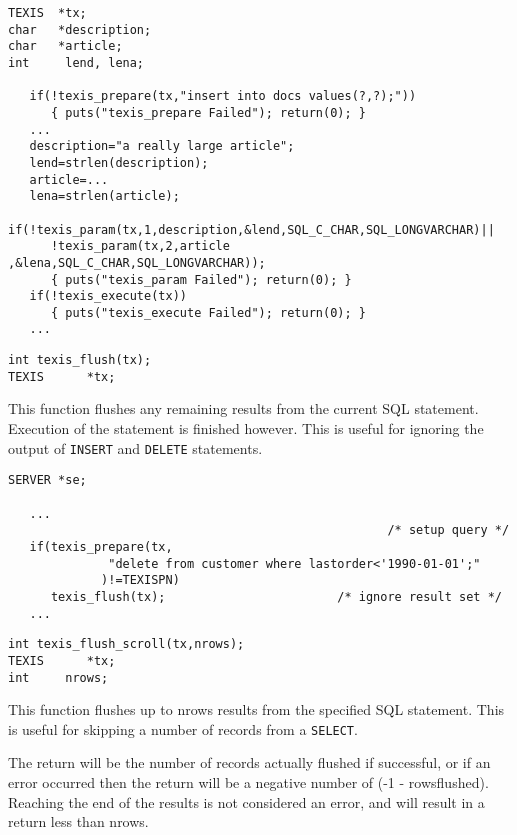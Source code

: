\EXAMPLE
\begin{verbatim}
TEXIS  *tx;
char   *description;
char   *article;
int     lend, lena;

   if(!texis_prepare(tx,"insert into docs values(?,?);"))
      { puts("texis_prepare Failed"); return(0); }
   ...
   description="a really large article";
   lend=strlen(description);
   article=...
   lena=strlen(article);
   if(!texis_param(tx,1,description,&lend,SQL_C_CHAR,SQL_LONGVARCHAR)||
      !texis_param(tx,2,article    ,&lena,SQL_C_CHAR,SQL_LONGVARCHAR));
      { puts("texis_param Failed"); return(0); }
   if(!texis_execute(tx))
      { puts("texis_execute Failed"); return(0); }
   ...
\end{verbatim}


\SYNOPSIS
\begin{verbatim}
int texis_flush(tx);
TEXIS      *tx;
\end{verbatim}

\DESCRIPTION

This function flushes any remaining results from the current SQL
statement. Execution of the statement is finished however. This
is useful for ignoring the output of \verb`INSERT` and \verb`DELETE` statements.

\EXAMPLE
\begin{verbatim}
SERVER *se;

   ...
                                                     /* setup query */
   if(texis_prepare(tx,
              "delete from customer where lastorder<'1990-01-01';"
             )!=TEXISPN)
      texis_flush(tx);                        /* ignore result set */
   ...
\end{verbatim}



\SYNOPSIS
\begin{verbatim}
int texis_flush_scroll(tx,nrows);
TEXIS      *tx;
int     nrows;
\end{verbatim}

\DESCRIPTION

This function flushes up to nrows results from the specified SQL
statement. This is useful for skipping a number of records from
a \verb`SELECT`.

The return will be the number of records actually flushed if
successful, or if an error occurred then the return will be a
negative number of (-1 - rowsflushed).  Reaching the end of the
results is not considered an error, and will result in a return
less than nrows.

